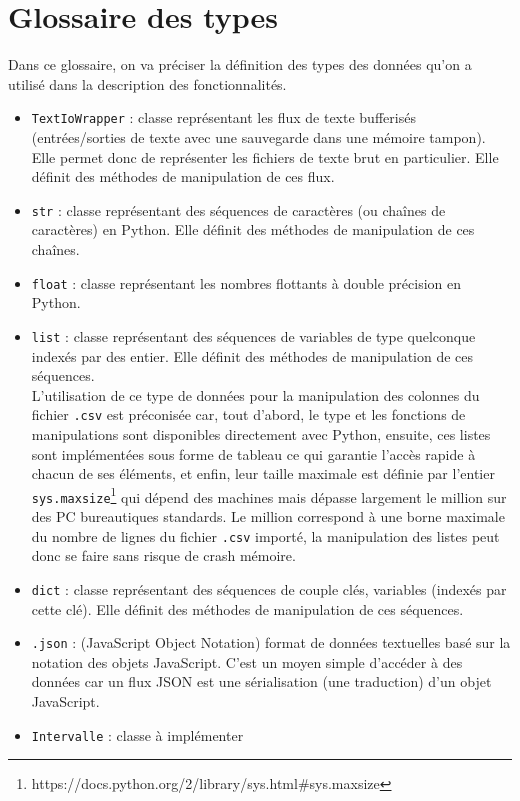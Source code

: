 	\section{Glossaire des types}
		Dans ce glossaire, on va préciser la définition des types des données qu'on a utilisé dans la description des fonctionnalités.
		\begin{itemize}
			\item \lstinline!TextIoWrapper! : classe représentant les flux de texte bufferisés (entrées/sorties de texte avec une sauvegarde dans une mémoire tampon). Elle permet donc de représenter les fichiers de texte brut en particulier. Elle définit des méthodes de manipulation de ces flux.
			\item \lstinline!str! : classe représentant des séquences de caractères (ou chaînes de caractères) en Python. Elle définit des méthodes de manipulation de ces chaînes.
			\item \lstinline!float! : classe représentant les nombres flottants à double précision en Python.
			\item \lstinline!list! : classe représentant des séquences de variables de type quelconque indexés par des entier. Elle définit des méthodes de manipulation de ces séquences.\\
				L'utilisation de ce type de données pour la manipulation des colonnes du fichier \lstinline!.csv! est préconisée car, tout d'abord, le type et les fonctions de manipulations sont disponibles directement avec Python, ensuite, ces listes sont implémentées sous forme de tableau ce qui garantie l'accès rapide à chacun de ses éléments, et enfin, leur taille maximale est définie par l'entier \lstinline!sys.maxsize!\footnote{https://docs.python.org/2/library/sys.html\#sys.maxsize} qui dépend des machines mais dépasse largement le million sur des PC bureautiques standards. Le million correspond à une borne maximale du nombre de lignes du fichier \lstinline!.csv! importé, la manipulation des listes peut donc se faire sans risque de crash mémoire.
			\item \lstinline!dict! : classe représentant des séquences de couple clés, variables (indexés par cette clé). Elle définit des méthodes de manipulation de ces séquences.
			\item \lstinline!.json! : (JavaScript Object Notation) format de données textuelles basé sur la notation des objets JavaScript. C'est un moyen simple d'accéder à des données car un flux JSON est une sérialisation (une traduction) d'un objet JavaScript.
			\item  \lstinline!Intervalle! : classe à implémenter

\end{itemize}
